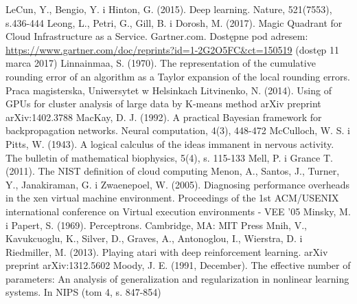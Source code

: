 \documentclass[12pt,a4paper,twoside]{article}
\begin{document}
\begin{thebibliography}{99}
 LeCun, Y., Bengio, Y. i Hinton, G. (2015). Deep learning. Nature, 521(7553), s.436-444
 Leong, L., Petri, G., Gill, B. i Dorosh, M. (2017). Magic Quadrant for Cloud Infrastructure as a Service. Gartner.com. Dostępne pod adresem: \url{https://www.gartner.com/doc/reprints?id=1-2G2O5FC&ct=150519} (dostęp 11 marca 2017)
 Linnainmaa, S. (1970). The representation of the cumulative rounding error of an algorithm as a
Taylor expansion of the local rounding errors. Praca magisterska, Uniwersytet w Helsinkach
 Litvinenko, N. (2014). Using of GPUs for cluster analysis of large data by K-means method arXiv preprint arXiv:1402.3788
 MacKay, D. J. (1992). A practical Bayesian framework for backpropagation networks. Neural computation, 4(3), 448-472
 McCulloch, W. S. i Pitts, W. (1943). A logical calculus of the ideas immanent in nervous activity. The bulletin of mathematical biophysics, 5(4), s. 115-133
 Mell, P. i Grance T. (2011). The NIST definition of cloud computing
 Menon, A., Santos, J., Turner, Y., Janakiraman, G. i Zwaenepoel, W. (2005). Diagnosing performance overheads in the xen virtual machine environment. Proceedings of the 1st ACM/USENIX international conference on Virtual execution environments - VEE '05
 Minsky, M. i Papert, S. (1969). Perceptrons. Cambridge, MA: MIT Press
 Mnih, V., Kavukcuoglu, K., Silver, D., Graves, A., Antonoglou, I., Wierstra, D. i Riedmiller, M. (2013). Playing atari with deep reinforcement learning. arXiv preprint arXiv:1312.5602
 Moody, J. E. (1991, December). The effective number of parameters: An analysis of generalization and regularization in nonlinear learning systems. In NIPS (tom 4, s. 847-854)

\end{thebibliography}
\end{document}
